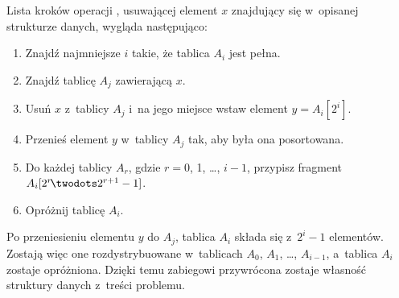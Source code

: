 \subproblem %
Lista kroków operacji , usuwającej element $x$ znajdujący się w~opisanej strukturze danych, wygląda następująco:
\begin{enumerate}
\item Znajdź najmniejsze $i$ takie, że tablica $A_i$ jest pełna.
\item Znajdź tablicę $A_j$ zawierającą $x$.
\item Usuń $x$ z~tablicy $A_j$ i~na jego miejsce wstaw element $y=A_i[2^i]$.
\item Przenieś element $y$ w~tablicy $A_j$ tak, aby była ona posortowana.
\item Do każdej tablicy $A_r$, gdzie $r=0$, 1, \dots, ${i-1}$, przypisz fragment $A_i[2^r\!\twodots2^{r+1}-1]$.
\item Opróżnij tablicę $A_i$.
\end{enumerate}
Po przeniesieniu elementu $y$ do $A_j$, tablica $A_i$ składa się z~$2^i-1$ elementów.
Zostają więc one rozdystrybuowane w~tablicach $A_0$, $A_1$, \dots, $A_{i-1}$, a~tablica $A_i$ zostaje opróżniona.
Dzięki temu zabiegowi przywrócona zostaje własność struktury danych z~treści problemu.
